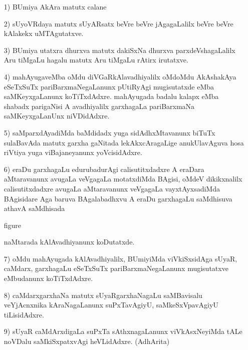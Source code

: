\begin{itemize}
\item[{\rm 1)}] BUmiya AkAra matutx calane
  
\item[{\rm 2)}] sUyoVRdaya matutx sUyARsatx beVre beVre jAgagaLalilx beVre beVre kAlakekx uMTAgutatxve.
  
\item[{\rm 3)}] BUmiya utatxra dhurxva matutx dakiSxNa dhurxva parxdeVshagaLalilx Aru tiMgaLu hagalu matutx Aru tiMgaLu rAtirx irutatxve.

\item[{\rm 4)}] mahAyugaveMba oMdu diVGaRkAlavadhiyalilx oMdoMdu AkAshakAya eSeTxSuTx pariBarxmaNegaLanunx pUtiRyAgi mugisutatxde eMba saMKeyxgaLanunx koTiTxdAdxre. mahAyugada badalu kalapx eMba shabadx parigaNisi A avadhiyalilx garxhagaLa pariBarxmaNa saMKeyxgaLanUnx niVDidAdxre. 

\item[{\rm 5)}] saMparxdAyadiMda baMdidadx yuga sidAdhxMtavanunx biTuTx sulaBavAda matutx garxha gaNitada lekAkxcAragaLige anukUlavAguva hosa riVtiya yuga viBajaneyanunx yoVcisidAdxre. 

\item[{\rm 6)}] eraDu garxhagaLu edurubadurAgi calisutitxdadxre A eraDara aMtaravanunx avugaLa veVgagaLa motatxdiMda BAgisi, oMdeV dikikxnalilx calisutitxdadxre avugaLa aMtaravanunx veVgagaLa vayxtAyxsadiMda BAgisidare Aga baruva BAgalabadhxvu A eraDu garxhagaLu saMdhisuva athavA saMdhisada
  \begin{center}
{\rm figure}
  \end{center}

  naMtarada kAlAvadhiyanunx koDutatxde.
  
\item[{\rm 7)}] oMdu mahAyugada kAlAvadhiyalilx, BUmiyiMda viVkiSxsidAga sUyaR, caMdarx, garxhagaLu eSeTxSuTx pariBarxmaNegaLanunx mugisutatxve eMbudanunx koTiTxdAdxre. 

\item[{\rm 8)}] caMdarxgarxhaNa matutx sUyaRgarxhaNagaLu saMBavisalu veYjAcnxnika kAraNagaLanunx suPxTavAgiyU, saMkeSxVpavAgiyU tiLisidAdxre. 
  
\item[{\rm 9)}] sUyaR caMdArxdigaLa suPxTa sAthxnagaLanunx viVkAsxNeyiMda tALe noVDalu saMkiSxpatxvAgi heVLidAdxre. (AdhArita)
\end{itemize}
